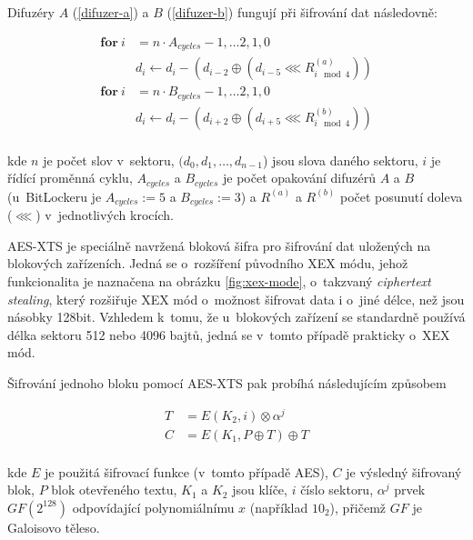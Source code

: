 Difuzéry $A$ (\ref{difuzer-a}) a $B$ (\ref{difuzer-b}) fungují při šifrování dat následovně:

\begin{align}
\mathbf{for}\ i &= n \cdot A_{cycles} - 1,  \dots 2, 1, 0 \nonumber \\
	&d_i \leftarrow d_i - (d_{i-2} \oplus (d_{i-5} \lll R^{(a)}_{i \mod 4})) \label{difuzer-a} \\
\mathbf{for}\ i &= n \cdot B_{cycles} - 1,  \dots 2, 1, 0 \nonumber \\
	&d_i \leftarrow d_i - (d_{i+2} \oplus (d_{i+5} \lll R^{(b)}_{i \mod 4})) \label{difuzer-b} \\
\nonumber
\end{align}

kde $n$ je počet slov v~sektoru, $(d_0, d_1,\dots,d_{n-1}$) jsou slova daného sektoru, $i$ je řídící proměnná cyklu, $A_{cycles}$ a $B_{cycles}$ je počet opakování difuzérů $A$ a $B$ (u~BitLockeru je $A_{cycles} := 5$ a $B_{cycles} := 3$) a $R^{(a)}$ a $R^{(b)}$ počet posunutí doleva ($\lll$) v~jednotlivých krocích.\cite{Ferguson2006}


\label{sec:aes-xts}

AES-XTS je speciálně navržená bloková šifra pro šifrování dat uložených na blokových zařízeních. Jedná se o~rozšíření původního XEX módu, jehož funkcionalita je naznačena na obrázku \ref{fig:xex-mode}, o~takzvaný \emph{ciphertext stealing}, který rozšiřuje XEX mód o~možnost šifrovat data i o~jiné délce, než jsou násobky 128bit.\cite{Dworkin2010} Vzhledem k~tomu, že u~blokových zařízení se standardně používá délka sektoru 512 nebo 4096 bajtů, jedná se v~tomto případě prakticky o~XEX mód.


Šifrování jednoho bloku pomocí AES-XTS pak probíhá následujícím způsobem

\begin{align}
T &= E (K_2 , i) \otimes \alpha^j \\
C &= E (K_1 , P \oplus T) \oplus T \\ \nonumber
\end{align}

kde $E$ je použitá šifrovací funkce (v~tomto případě AES), $C$ je výsledný šifrovaný blok, $P$ blok otevřeného textu, $K_1$ a $K_2$ jsou klíče, $i$ číslo sektoru, $\alpha^j$ prvek $GF(2^{128})$ odpovídající polynomiálnímu $x$ (například $10_2$), přičemž $GF$ je Galoisovo těleso.\cite{IEEE2008}

